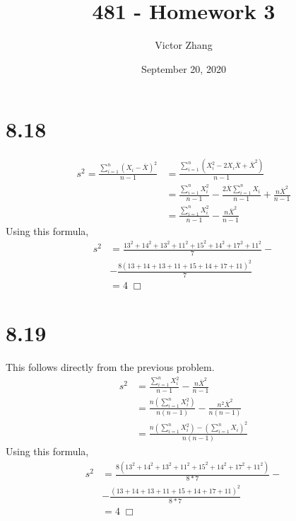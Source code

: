 \documentclass{article}
\title{481 - Homework 3}
\author{Victor Zhang}
\date{September 20, 2020}
\begin{document}
\maketitle

\section*{8.18}
\begin{equation*}
\begin{split}
  s^2 = \frac{\sum\limits^n_{i=1} (X_i - \overline{X})^2}{n-1} &= \frac{\sum\limits^n_{i=1} (X_i^2 - 2X_i\overline{X} + \overline{X}^2)}{n-1}\\
  &= \frac{\sum\limits^n_{i=1} X_i^2}{n-1} - \frac{2\overline{X}\sum\limits_{i=1}^n X_i}{n-1} + \frac{n\overline{X}^2}{n-1}\\
  &= \frac{\sum\limits^n_{i=1} X_i^2}{n-1} - \frac{n\overline{X}^2}{n-1}
\end{split}
\end{equation*}
Using this formula,
\begin{equation*}
\begin{split}
  s^2 &= \frac{13^2 + 14^2 + 13^2 + 11^2 + 15^2 + 14^2 + 17^2 + 11^2}{7} -\\
  &- \frac{8(13 + 14 + 13 + 11 + 15 + 14 + 17 + 11)^2}{7}\\
  &= 4 \; \Box
\end{split}
\end{equation*}

\section*{8.19}
This follows directly from the previous problem.
\begin{equation*}
\begin{split}
  s^2 &= \frac{\sum\limits^n_{i=1} X_i^2}{n-1} - \frac{n\overline{X}^2}{n-1}\\
  &= \frac{n\left(\sum\limits^n_{i=1} X_i^2\right)}{n(n-1)} - \frac{n^2\overline{X}^2}{n(n-1)}\\
  &= \frac{n\left(\sum\limits^n_{i=1} X_i^2\right) - \left(\sum\limits^n_{i=1} X_i\right)^2}{n(n-1)}
\end{split}
\end{equation*}
Using this formula,
\begin{equation*}
\begin{split}
  s^2 &= \frac{8(13^2 + 14^2 + 13^2 + 11^2 + 15^2 + 14^2 + 17^2 + 11^2)}{8*7} -\\
  &- \frac{(13 + 14 + 13 + 11 + 15 + 14 + 17 + 11)^2}{8*7}\\
  &= 4 \; \Box
\end{split}
\end{equation*}
\end{document}
